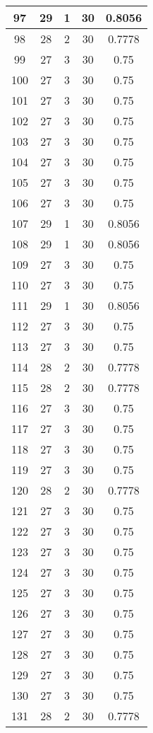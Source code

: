 \documentclass[letterpaper, 12pt]{article}
\begin{document}
\begin{longtable}{|c|c|c|c|c|}
\hline
97 & 29 & 1 & 30 & 0.8056 \\
\hline
98 & 28 & 2 & 30 & 0.7778 \\
\hline
99 & 27 & 3 & 30 & 0.75 \\
\hline
100 & 27 & 3 & 30 & 0.75 \\
\hline
101 & 27 & 3 & 30 & 0.75 \\
\hline
102 & 27 & 3 & 30 & 0.75 \\
\hline
103 & 27 & 3 & 30 & 0.75 \\
\hline
104 & 27 & 3 & 30 & 0.75 \\
\hline
105 & 27 & 3 & 30 & 0.75 \\
\hline
106 & 27 & 3 & 30 & 0.75 \\
\hline
107 & 29 & 1 & 30 & 0.8056 \\
\hline
108 & 29 & 1 & 30 & 0.8056 \\
\hline
109 & 27 & 3 & 30 & 0.75 \\
\hline
110 & 27 & 3 & 30 & 0.75 \\
\hline
111 & 29 & 1 & 30 & 0.8056 \\
\hline
112 & 27 & 3 & 30 & 0.75 \\
\hline
113 & 27 & 3 & 30 & 0.75 \\
\hline
114 & 28 & 2 & 30 & 0.7778 \\
\hline
115 & 28 & 2 & 30 & 0.7778 \\
\hline
116 & 27 & 3 & 30 & 0.75 \\
\hline
117 & 27 & 3 & 30 & 0.75 \\
\hline
118 & 27 & 3 & 30 & 0.75 \\
\hline
119 & 27 & 3 & 30 & 0.75 \\
\hline
120 & 28 & 2 & 30 & 0.7778 \\
\hline
121 & 27 & 3 & 30 & 0.75 \\
\hline
122 & 27 & 3 & 30 & 0.75 \\
\hline
123 & 27 & 3 & 30 & 0.75 \\
\hline
124 & 27 & 3 & 30 & 0.75 \\
\hline
125 & 27 & 3 & 30 & 0.75 \\
\hline
126 & 27 & 3 & 30 & 0.75 \\
\hline
127 & 27 & 3 & 30 & 0.75 \\
\hline
128 & 27 & 3 & 30 & 0.75 \\
\hline
129 & 27 & 3 & 30 & 0.75 \\
\hline
130 & 27 & 3 & 30 & 0.75 \\
\hline
131 & 28 & 2 & 30 & 0.7778 \\

\end{longtable}
\end{document}
